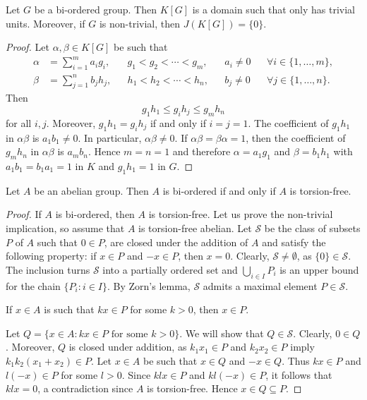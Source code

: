 \begin{graybox}
\begin{theorem}
	\label{thm:BO}
	Let $G$ be a bi-ordered group. Then $K[G]$ is a domain such that
	only has trivial units. Moreover, if $G$ is non-trivial, 
	then $J(K[G])=\{0\}$. 
\end{theorem}

\begin{proof}
	Let $\alpha,\beta\in K[G]$ be such that  
	\begin{align*}
		\alpha&=\sum_{i=1}^m a_ig_i, && g_1<g_2<\cdots<g_m,&& a_i\ne 0 && \forall i\in\{1,\dots,m\},\\
		\beta&=\sum_{j=1}^n b_jh_j, && h_1<h_2<\cdots<h_n, && b_j\ne 0 && \forall j\in\{1,\dots,n\}.
	\end{align*}
	Then 
	\[
		g_1h_1\leq g_ih_j\leq g_mh_n
	\]
	for all $i,j$. Moreover, $g_1h_1=g_ih_j$ if and only if $i=j=1$. The
	coefficient of $g_1h_1$ in $\alpha\beta$ is $a_1b_1\ne 0$. In particular, 
	$\alpha\beta\ne0$. If $\alpha\beta=\beta\alpha=1$, then the coefficient of
	$g_mh_n$ in $\alpha\beta$ is $a_mb_n$. Hence $m=n=1$ and therefore 
	$\alpha=a_1g_1$ and $\beta=b_1h_1$ with $a_1b_1=b_1a_1=1$ in $K$ and $g_1h_1=1$
	in $G$.
\end{proof}

\begin{theorem}[Levi]
	\label{thm:Levi}
	Let $A$ be an abelian group. Then $A$ is bi-ordered if and only
	if $A$ is torsion-free.
\end{theorem}

\begin{proof}
	If $A$ is bi-ordered, then $A$ is torsion-free. Let us prove the non-trivial implication, 
	so assume that
	$A$ is torsion-free abelian. Let $\mathcal{S}$ be the class 
	of subsets $P$ of $A$ such that $0\in P$, are closed under 
	the addition of
	$A$ and satisfy the following property: if $x\in P$ and $-x\in P$,
	then $x=0$.
	Clearly, $\mathcal{S}\ne\emptyset$, as 
	$\{0\}\in\mathcal{S}$.  The inclusion turns $\mathcal{S}$ into a partially ordered set  
	and $\bigcup_{i\in I}P_i$ is an upper bound for the chain 
	$\{P_i:i\in I\}$. By Zorn's lemma, 
	$\mathcal{S}$ admits a maximal element $P\in\mathcal{S}$.

	\begin{claim}
		If $x\in A$ is such that $kx\in P$ for some $k>0$, then  $x\in P$.		
	\end{claim}

	Let $Q=\{x\in A:kx\in P\text{ for some 
	$k>0$}\}$. We will show that $Q\in\mathcal{S}$.  Clearly, $0\in Q$. Moreover, $Q$
	is closed under addition, as $k_1x_1\in P$ and $k_2x_2\in P$ imply 
	$k_1k_2(x_1+x_2)\in P$. Let $x\in A$ be such that $x\in Q$ and $-x\in Q$. Thus 
	$kx\in P$ and $l(-x)\in P$ for some $l>0$. Since $klx\in P$ and 
	$kl(-x)\in P$, it follows that $klx=0$, a contradiction since $A$ is torsion-free. 
	Hence $x\in Q\subseteq P$. 


\end{proof}
\end{graybox}
